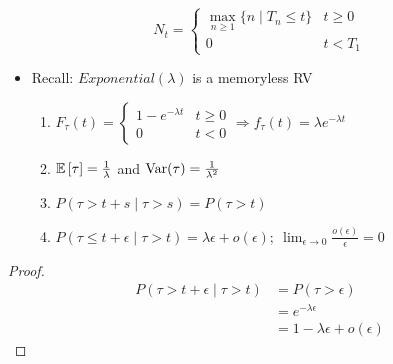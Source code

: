 \begin{definition}

  \begin{displaymath}
    N_t =
    \begin{cases}
      \max_{n \geq 1} \{n \mid T_n \leq t\} & t \geq 0 \\
      0 & t < T_1
    \end{cases}
  \end{displaymath}

\end{definition}

\begin{itemize}
  \item Recall: $Exponential(\lambda)$ is a memoryless RV
    \begin{enumerate}
      \item $F_{\tau}(t) =
        \begin{cases}
          1 - e^{-\lambda t} & t \geq 0 \\
          0 & t < 0
        \end{cases} \Rightarrow f_{\tau}(t) = \lambda e^{-\lambda t}$
      \item $\operatorname{\mathbb{E}}\left[\tau\right] = \frac{1}{\lambda}$ and $\operatorname{\mathrm{Var}}(\tau)
        = \frac{1}{\lambda^2}$
      \item $P(\tau > t + s \mid \tau > s) = P(\tau > t)$
      \item $P(\tau \leq t + \epsilon \mid \tau > t) = \lambda
        \epsilon +o(\epsilon);\ \lim_{\epsilon \rightarrow 0} \frac{o(\epsilon)}{\epsilon} = 0$
    \end{enumerate}
\end{itemize}

\begin{proof}

  \begin{align*}
    P(\tau > t + \epsilon \mid \tau > t) &= P(\tau > \epsilon) \\
                                         &= e^{-\lambda \epsilon} \\
                                         &= 1 - \lambda \epsilon + o(\epsilon)
  \end{align*}

\end{proof}

